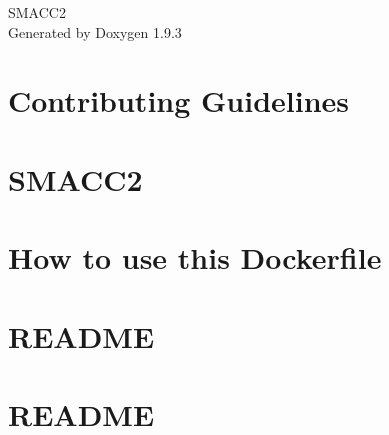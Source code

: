 \documentclass[twoside]{book}
\newcommand{\+}{\discretionary{\mbox{\scriptsize$\hookleftarrow$}}{}{}}
\newcommand{\clearemptydoublepage}{%
    \newpage{\pagestyle{empty}\cleardoublepage}%
  }
\begin{document}
  \raggedbottom
    \hypersetup{pageanchor=false,
                bookmarksnumbered=true,
                pdfencoding=unicode
               }
  \begin{titlepage}
  \vspace*{7cm}
  \begin{center}%
  {\Large SMACC2}\\
  \vspace*{1cm}
  {\large Generated by Doxygen 1.9.3}\\
  \end{center}
  \end{titlepage}
  \clearemptydoublepage
  \tableofcontents
  \clearemptydoublepage
  \hypersetup{pageanchor=true}
\chapter{Contributing Guidelines}
\label{md_CONTRIBUTING}

\chapter{SMACC2}
\label{md_README}

\chapter{How to use this Dockerfile}
\label{md_smacc2_ci_docker_ros_rollingAndGalactic_ubuntu_20_04_README}

\chapter{README}
\label{md_smacc2_performance_tools__smacc2_sm_template_README}

\chapter{README}
\label{md_smacc2_performance_tools_performance_tests_sm_atomic_performance_trace_1_README}

\end{document}
